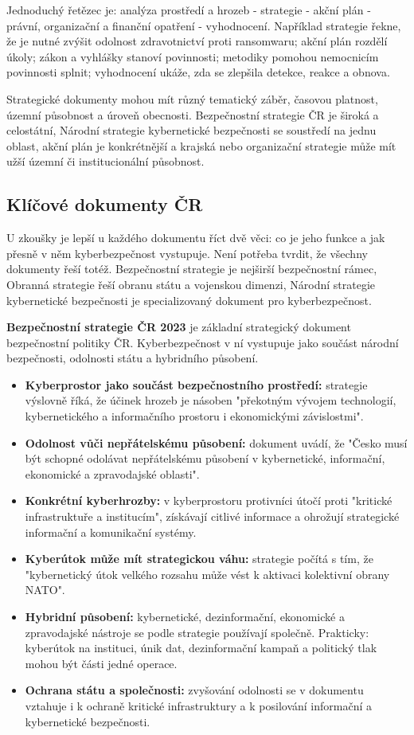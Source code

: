 Jednoduchý řetězec je: analýza prostředí a hrozeb - strategie - akční plán - právní, organizační a finanční opatření - vyhodnocení. Například strategie řekne, že je nutné zvýšit odolnost zdravotnictví proti ransomwaru; akční plán rozdělí úkoly; zákon a vyhlášky stanoví povinnosti; metodiky pomohou nemocnicím povinnosti splnit; vyhodnocení ukáže, zda se zlepšila detekce, reakce a obnova.

Strategické dokumenty mohou mít různý tematický záběr, časovou platnost, územní působnost a úroveň obecnosti. Bezpečnostní strategie ČR je široká a celostátní, Národní strategie kybernetické bezpečnosti se soustředí na jednu oblast, akční plán je konkrétnější a krajská nebo organizační strategie může mít užší územní či institucionální působnost.

\subsection*{Klíčové dokumenty ČR}
U zkoušky je lepší u každého dokumentu říct dvě věci: co je jeho funkce a jak přesně v něm kyberbezpečnost vystupuje. Není potřeba tvrdit, že všechny dokumenty řeší totéž. Bezpečnostní strategie je nejširší bezpečnostní rámec, Obranná strategie řeší obranu státu a vojenskou dimenzi, Národní strategie kybernetické bezpečnosti je specializovaný dokument pro kyberbezpečnost.

\textbf{Bezpečnostní strategie ČR 2023} je základní strategický dokument bezpečnostní politiky ČR. Kyberbezpečnost v ní vystupuje jako součást národní bezpečnosti, odolnosti státu a hybridního působení.
\begin{itemize}
  \item \textbf{Kyberprostor jako součást bezpečnostního prostředí:} strategie výslovně říká, že účinek hrozeb je násoben "překotným vývojem technologií, kybernetického a informačního prostoru i ekonomickými závislostmi".
  \item \textbf{Odolnost vůči nepřátelskému působení:} dokument uvádí, že "Česko musí být schopné odolávat nepřátelskému působení v kybernetické, informační, ekonomické a zpravodajské oblasti".
  \item \textbf{Konkrétní kyberhrozby:} v kyberprostoru protivníci útočí proti "kritické infrastruktuře a institucím", získávají citlivé informace a ohrožují strategické informační a komunikační systémy.
  \item \textbf{Kyberútok může mít strategickou váhu:} strategie počítá s tím, že "kybernetický útok velkého rozsahu může vést k aktivaci kolektivní obrany NATO".
  \item \textbf{Hybridní působení:} kybernetické, dezinformační, ekonomické a zpravodajské nástroje se podle strategie používají společně. Prakticky: kyberútok na instituci, únik dat, dezinformační kampaň a politický tlak mohou být části jedné operace.
  \item \textbf{Ochrana státu a společnosti:} zvyšování odolnosti se v dokumentu vztahuje i k ochraně kritické infrastruktury a k posilování informační a kybernetické bezpečnosti.
\end{itemize}

